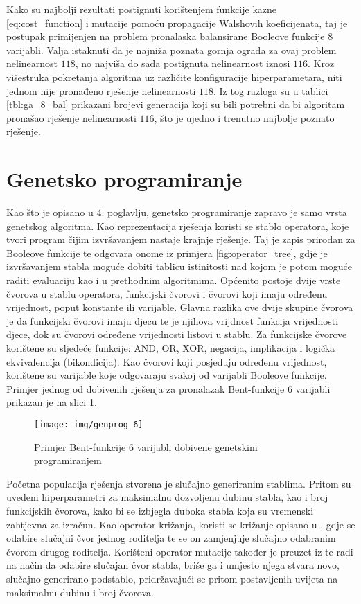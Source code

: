Kako su najbolji rezultati postignuti korištenjem funkcije kazne \eqref{eq:cost_function} i mutacije pomoću propagacije Walshovih koeficijenata, taj je postupak primijenjen na problem pronalaska balansirane Booleove funkcije $8$ varijabli.
Valja istaknuti da je najniža poznata gornja ograda za ovaj problem nelinearnost $118$, no najviša do sada postignuta nelinearnost iznosi $116$.
Kroz višestruka pokretanja algoritma uz različite konfiguracije hiperparametara, niti jednom nije pronađeno rješenje nelinearnosti $118$.
Iz tog razloga su u tablici \ref{tbl:ga_8_bal} prikazani brojevi generacija koji su bili potrebni da bi algoritam pronašao rješenje nelinearnosti $116$, što je ujedno i trenutno najbolje poznato rješenje.

\section{Genetsko programiranje}
Kao što je opisano u 4. poglavlju, genetsko programiranje zapravo je samo vrsta genetskog algoritma.
Kao reprezentacija rješenja koristi se stablo operatora, koje tvori program čijim izvršavanjem nastaje krajnje rješenje.
Taj je zapis prirodan za Booleove funkcije te odgovara onome iz primjera \ref{fig:operator_tree}, gdje je izvršavanjem stabla moguće dobiti tablicu istinitosti nad kojom je potom moguće raditi evaluaciju kao i u prethodnim algoritmima.
Općenito postoje dvije vrste čvorova u stablu operatora, funkcijski čvorovi i čvorovi koji imaju određenu vrijednost, poput konstante ili varijable.
Glavna razlika ove dvije skupine čvorova je da funkcijski čvorovi imaju djecu te je njihova vrijdnost funkcija vrijednosti djece, dok su čvorovi određene vrijednosti listovi u stablu.
Za funkcijske čvorove korištene su sljedeće funkcije: AND, OR, XOR, negacija, implikacija i logička ekvivalencija (bikondicija).
Kao čvorovi koji posjeduju određenu vrijednost, korištene su varijable koje odgovaraju svakoj od varijabli Booleove funkcije.
Primjer jednog od dobivenih rješenja za pronalazak Bent-funkcije $6$ varijabli prikazan je na slici \ref{fig:genprog_6}.

\begin{figure}[ht!]
    \centering
    \texttt{[image: img/genprog\_6]}
    \captionsetup{justification=centering}
    \caption{Primjer Bent-funkcije $6$ varijabli dobivene genetskim programiranjem}
    \label{fig:genprog_6}
\end{figure}

Početna populacija rješenja stvorena je slučajno generiranim stablima.
Pritom su uvedeni hiperparametri za maksimalnu dozvoljenu dubinu stabla, kao i broj funkcijskih čvorova, kako bi se izbjegla duboka stabla koja su vremenski zahtjevna za izračun.
Kao operator križanja, koristi se križanje opisano u \cite{PrirodomInspirirani}, gdje se odabire slučajni čvor jednog roditelja te se on zamjenjuje slučajno odabranim čvorom drugog roditelja.
Korišteni operator mutacije također je preuzet iz \cite{PrirodomInspirirani} te radi na način da odabire slučajan čvor stabla, briše ga i umjesto njega stvara novo, slučajno generirano podstablo, pridržavajući se pritom postavljenih uvijeta na maksimalnu dubinu i broj čvorova.


